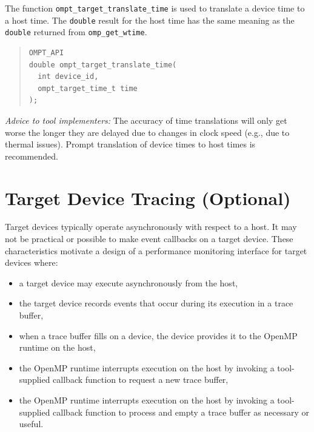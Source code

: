 \documentclass{article}
\begin{document}
The function \verb|ompt_target_translate_time| is used to translate a device time to a host time. The {\tt double} result for the host time has the same meaning as the {\tt double} returned from \verb|omp_get_wtime|.
\begin{quote}
\begin{verbatim}
OMPT_API 
double ompt_target_translate_time(
  int device_id, 
  ompt_target_time_t time
);
\end{verbatim}
\end{quote}
\noindent
{\em Advice to tool implementers:} The accuracy of time translations will only get worse the longer they are delayed due to changes in clock speed (e.g., due to thermal issues). Prompt translation of device times to host times is recommended.

\section{Target Device Tracing (Optional)}
\label{sec:target-device-records}

Target devices typically operate asynchronously with respect to a host. It may not be practical or possible to make event callbacks on a target device. These characteristics motivate a design of a performance monitoring interface for target devices where: 
\begin{itemize}
\item a target device may execute asynchronously from the host,
\item the target device records events that occur during its execution in a trace buffer,
\item when a trace buffer fills on a device,  the device provides it to the OpenMP runtime  on the host,
\item the OpenMP runtime  interrupts execution on the host by invoking a tool-supplied callback function to request a new trace buffer,
\item the OpenMP runtime  interrupts execution on the host by invoking a tool-supplied callback function to process and empty a trace buffer as necessary or useful.
\end{itemize}
\end{document}
